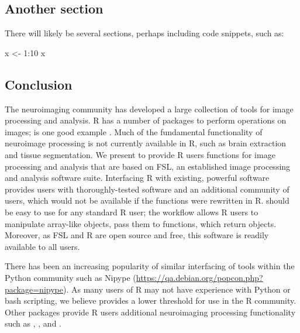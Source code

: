\subsection{Another section}\label{another-section}

There will likely be several sections, perhaps including code snippets,
such as:

\begin{Schunk}
\begin{Sinput}
x <- 1:10
x
\end{Sinput}
\end{Schunk}

\subsection{Conclusion}\label{conclusion}

The neuroimaging community has developed a large collection of tools for
image processing and analysis. R has a number of packages to perform
operations on images;  is one good example
\citep{EBImage}. Much of the fundamental functionality of neuroimage
processing is not currently available in R, such as brain extraction and
tissue segmentation. We present  to provide R users functions
for image processing and analysis that are based on FSL, an established
image processing and analysis software suite. Interfacing R with
existing, powerful software provides users with thoroughly-tested
software and an additional community of users, which would not be
available if the functions were rewritten in R.  should be
easy to use for any standard R user; the workflow allows R users to
manipulate array-like  objects, pass them to 
functions, which return  objects. Moreover, as FSL and R are
open source and free, this software is readily available to all users.

There has been an increasing popularity of similar interfacing of tools
within the Python community such as Nipype
\citep{gorgolewski_nipype:_2011}
(\url{https://qa.debian.org/popcon.php?package=nipype}). As many users
of R may not have experience with Python or bash scripting, we believe
 provides a lower threshold for use in the R community. Other
packages provide R users additional neuroimaging processing
functionality such as 
\citep{bordier_temporal_2011}, 
\citep{modat_rniftyreg:_2013}, and 
\citep{tabelow_statistical_2011}.

